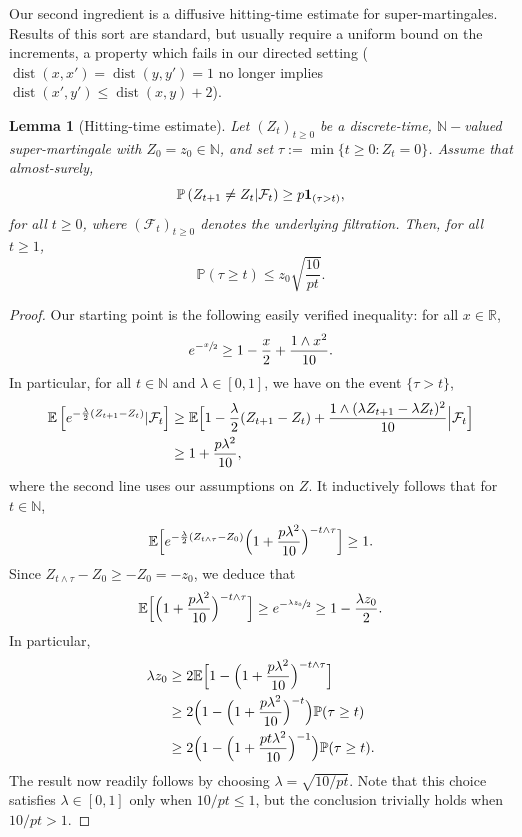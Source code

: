 \documentclass[JEP,XML,SOM,Unicode,NoEqCountersInSection,published]{cedram}
\newtheorem{lemma}{Lemma}
\theoremstyle{definition}
\newcommand{\dN}{\mathbb {N}}
\newcommand{\dR}{\mathbb {R}}
\newcommand{\EE}{{\mathbb{E}}}
\newcommand{\PP}{{\mathbb{P}}}
\newcommand{\cF}{\mathcal {F}}
\DeclareMathOperator{\dist}{dist}
\begin{document}
Our second ingredient is a diffusive hitting-time estimate for super-martingales. Results of this sort are standard, but usually require a uniform bound on the increments, a property which fails in our directed setting ($\dist(x,x')=\dist(y,y')=1$ no longer implies $\dist(x',y')\le \dist(x,y)+2$).
\begin{lemma}[Hitting-time estimate]\label{lm:super}Let $(Z_t)_{t\ge 0}$ be a discrete-time, $\dN-$valued super-martingale with $Z_0=z_0\in\dN$, and set $\tau:=\min\{t\ge 0\colon Z_t= 0\}$. Assume that almost-surely,
\begin{equation*}
\PP\left(Z_{t+1}\ne Z_t | \cF_t\right) \ge p {\bf 1}_{(\tau>t)},
\end{equation*}
for all $t\ge 0$, where $(\cF_t)_{t\ge 0}$ denotes the underlying filtration. Then, for all $t\ge 1$,
\begin{equation*}
\PP(\tau\ge t) \le z_0\sqrt{\frac{10}{pt}}.
\end{equation*}
\end{lemma}
\begin{proof}Our starting point is the following easily verified inequality: for all $x\in\dR$,
\begin{equation*}
e^{-\sfrac{x}{2}} \ge 1-\frac{x}{2} + \frac{1 \wedge x^2}{10}.
\end{equation*}
In particular, for all $t\in\dN$ and $\lambda\in[0,1]$, we have on the event $\{\tau>t\}$,
\begin{align*}
\EE\left[e^{-\frac{\lambda}{2}(Z_{t+1}-Z_t)}|\cF_t\right] & \ge \EE\Bigl[1-\frac{\lambda}{2}(Z_{t+1}-Z_t)+ \frac{1\wedge (\lambda Z_{t+1}-\lambda Z_t)^2}{10}\Big|\cF_t\Bigr]\\
& \ge 1+\frac{p\lambda^2}{10},
\end{align*}
where the second line uses our assumptions on $Z$. It inductively follows that for $t\in\dN$,
\begin{equation*}
\EE \Bigl[e^{-\frac{\lambda}{2} (Z_{t\wedge\tau}-Z_0)} \Bigl(1+\frac{p\lambda^2}{10} \Bigr)^{-t\wedge \tau} \Bigr] \ge 1.
\end{equation*}
Since $Z_{t\wedge\tau}-Z_0\ge -Z_0=-z_0$, we deduce that
\begin{equation*}
\EE \Bigl[\Bigl(1+\frac{p\lambda^2}{10} \Bigr)^{-t\wedge \tau} \Bigr] \ge e^{-\sfrac{\lambda z_0}{2}} \ge 1-\frac{\lambda z_0}{2}.
\end{equation*}
In particular,
\begin{align*}
{\lambda z_0} & \ge 2\EE \Bigl[1-\Bigl(1+\frac{p\lambda^2}{10} \Bigr)^{-t\wedge \tau} \Bigr]\\
& \ge 2 \Bigl(1-\Bigl(1+\frac{p\lambda^2}{10} \Bigr)^{-t} \Bigr)\PP(\tau\ge t)\\
& \ge 2 \Bigl(1-\Bigl(1+\frac{p t\lambda^2}{10} \Bigr)^{-1} \Bigr)\PP(\tau\ge t).
\end{align*}
The result now readily follows by choosing $\lambda= \sqrt{10/pt}$. Note that this choice satisfies $\lambda\in[0,1]$ only when $10/pt\le 1$, but the conclusion trivially holds when $10/pt> 1$.
\end{proof}
\end{document}
